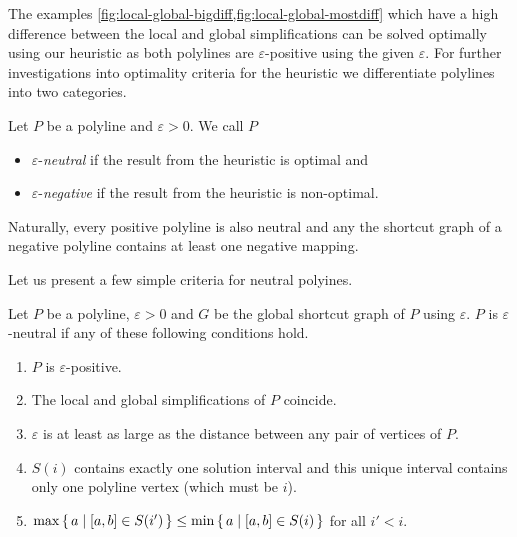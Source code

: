 The examples \cref{fig:local-global-bigdiff,fig:local-global-mostdiff} which have a high difference between the local and global simplifications can be solved optimally using our heuristic as both polylines are \(\varepsilon\)-positive using the given \(\varepsilon\). For further investigations into optimality criteria for the heuristic we differentiate polylines into two categories.

\begin{definition}
  Let \(P\) be a polyline and \(\varepsilon > 0\). We call \(P\)
	\begin{itemize}
		\item \(\varepsilon\)-\emph{neutral} if the result from the heuristic is optimal and 
		\item \(\varepsilon\)-\emph{negative} if the result from the heuristic is non-optimal.
	\end{itemize}
\end{definition}

Naturally, every positive polyline is also neutral and any the shortcut graph of a negative polyline contains at least one negative mapping. 

Let us present a few simple criteria for neutral polyines.
\begin{lemma}
  Let \(P\) be a polyline, \(\varepsilon > 0\) and \(G\) be the global shortcut graph of \(P\) using \(\varepsilon\). \(P\) is \(\varepsilon\)-neutral if any of these following conditions hold.
	\begin{enumerate}
		\item \(P\) is \(\varepsilon\)-positive.
		\item The local and global simplifications of \(P\) coincide.
		\item \(\varepsilon\) is at least as large as the distance between any pair of vertices of \(P\).
		\item \(S(i)\) contains exactly one solution interval and this unique interval contains only one polyline vertex (which must be \(i\)).
		\item \(\max \set{a \mid [a, b] \in S(i')} \leq \min \set{a \mid [a, b] \in S(i)}\) for all \(i' < i\).
	\end{enumerate}
\end{lemma}

